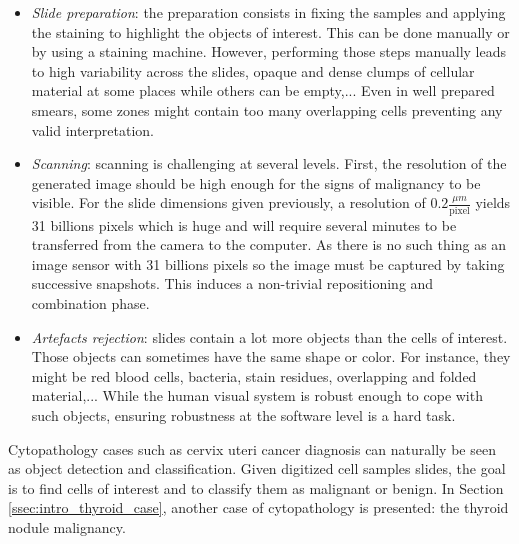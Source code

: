 \begin{itemize}
	\item \textit{Slide preparation}: the preparation consists in fixing the samples and applying the staining to highlight the objects of interest. This can be done manually or by using a staining machine. However, performing those steps manually leads to high variability across the slides, opaque and dense clumps of cellular material at some places while others can be empty,... Even in well prepared smears, some zones might contain too many overlapping cells preventing any valid interpretation. 
	\item \textit{Scanning}: scanning is challenging at several levels. First, the resolution of the generated image should be high enough for the signs of malignancy to be visible. For the slide dimensions given previously, a resolution of $0.2 \frac{\mu m}{\text{pixel}}$ yields 31 billions pixels which is huge and will require several minutes to be transferred from the camera to the computer. As there is no such thing as an image sensor with 31 billions pixels so the image must be captured by taking successive snapshots. This induces a non-trivial repositioning and combination phase.
	\item \textit{Artefacts rejection}: slides contain a lot more objects than the cells of interest. Those objects can sometimes have the same shape or color. For instance, they might be red blood cells, bacteria, stain residues, overlapping and folded material,... While the human visual system is robust enough to cope with such objects, ensuring robustness at the software level is a hard task.
\end{itemize}

Cytopathology cases such as cervix uteri cancer diagnosis can naturally be seen as object detection and classification. Given digitized cell samples slides, the goal is to find cells of interest and to classify them as malignant or benign. In Section \ref{ssec:intro_thyroid_case}, another case of cytopathology is presented: the thyroid nodule malignancy. 


